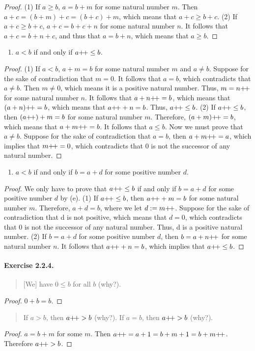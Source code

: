 \begin{proof}
    (1) If $a\geq b$, $a=b+m$ for some natural number $m$. Then $a+c=(b+m)+c=(b+c)+m$, which means that $a+c\geq b+c$. (2) If $a+c\geq b+c$, $a+c = b+c + n$ for some natural number $n$. It follows that $a+c=b+n+c$, and thus that $a=b+n$, which means that $a\geq b$.
\end{proof}
\begin{enumerate}[resume]
    \item $a<b$ if and only if $a{+}{\mkern-3mu}{+} \leq b$.
\end{enumerate}
\begin{proof}
    (1) If $a<b$, $a+m=b$ for some natural number $m$ and $a\neq b$. Suppose for the sake of contradiction that $m=0$. It follows that $a=b$, which contradicts that $a\neq b$. Then $m\neq 0$, which means it is a positive natural number. Thus, $m=n{+}{\mkern-3mu}{+}$ for some natural number $n$. It follows that $a+n{+}{\mkern-3mu}{+}=b$, which means that $(a+n){+}{\mkern-3mu}{+}=b$, which means that $a{+}{\mkern-3mu}{+} + n = b$. Thus, $a{+}{\mkern-3mu}{+} \leq b$.
    (2) If $a{+}{\mkern-3mu}{+} \leq b$, then $(a{+}{\mkern-3mu}{+})+m=b$ for some natural number $m$. Therefore, $(a+m){+}{\mkern-3mu}{+}=b$, which means that $a+m{+}{\mkern-3mu}{+}=b$. It follows that $a\leq b$. Now we must prove that $a \neq b$. Suppose for the sake of contradiction that $a=b$, then $a+m{+}{\mkern-3mu}{+}=a$, which implies that $m{+}{\mkern-3mu}{+}=0$, which contradicts that $0$ is not the successor of any natural number.
\end{proof}
\begin{enumerate}[resume]
    \item $a<b$ if and only if $b=a+d$ for some positive number $d$.
\end{enumerate}
\begin{proof}
    We only have to prove that $a{+}{\mkern-3mu}{+} \leq b$ if and only if $b=a+d$ for some positive number $d$ by (e).
    (1) If $a{+}{\mkern-3mu}{+} \leq b$, then $a{+}{\mkern-3mu}{+} + m = b$ for some natural number $m$. Therefore, $a + d = b$, where we let $d:=m{+}{\mkern-3mu}{+}$. Suppose for the sake of contradiction that d is not positive, which means that $d=0$, which contradicts that $0$ is not the successor of any natural number. Thus, d is a positive natural number.
    (2) If $b=a+d$ for some positive number $d$, then $b=a+n{+}{\mkern-3mu}{+}$ for some natural number $n$. It follows that $a{+}{\mkern-3mu}{+} + n =b$, which implies that $a{+}{\mkern-3mu}{+} \leq b$.
\end{proof}

\paragraph{Exercise 2.2.4.}
\begin{quote}
    [We] have $0\leq b$ for all $b$ (why?).
\end{quote}
\begin{proof}
    $0+b=b$.
\end{proof}
\begin{quote}
    If $a>b$, then $a{+}{\mkern-3mu}{+} >b$ (why?). If $a=b$, then $a{+}{\mkern-3mu}{+} >b$ (why?).
\end{quote}
\begin{proof}
    $a=b+m$ for some $m$. Then $a{+}{\mkern-3mu}{+}=a+1=b+m+1=b+m{+}{\mkern-3mu}{+}$. Therefore $a{+}{\mkern-3mu}{+} >b$.
\end{proof}

